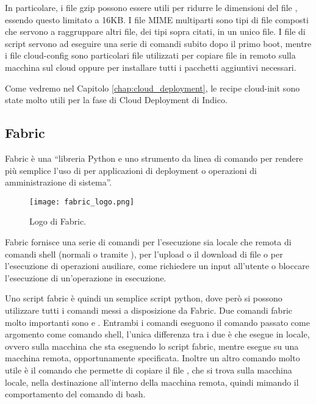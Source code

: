            In particolare, i file gzip possono essere utili per ridurre le dimensioni del file , essendo questo limitato a 16KB. I file \ac{MIME} multiparti sono tipi di file composti che servono a raggruppare altri file, dei tipi sopra citati, in un unico file. I file di script servono ad eseguire una serie di comandi subito dopo il primo boot, mentre i file cloud-config sono particolari file utilizzati per copiare file in remoto sulla macchina sul cloud oppure per installare tutti i pacchetti aggiuntivi necessari.
            
            Come vedremo nel Capitolo \ref{chap:cloud_deployment}, le recipe cloud-init sono state molto utili per la fase di Cloud Deployment di Indico.
                    
        \subsection{Fabric} \label{subsec:p;sl;fabric}
        
            Fabric è una ``libreria Python e uno strumento da linea di comando per rendere più semplice l'uso di  per applicazioni di deployment o operazioni di amministrazione di sistema''. \cite{fabric:documentation}
            
        	\begin{figure}[h!]
        		\begin{center}
        			\texttt{[image: fabric\_logo.png]}
        		\end{center}
        		\caption[Logo di Fabric]{Logo di Fabric.}
        		\label{fig:fabric_logo}
        	\end{figure}
            
            Fabric fornisce una serie di comandi per l'esecuzione sia locale che remota di comandi shell (normali o tramite ), per l'upload o il download di file o per l'esecuzione di operazioni ausiliare, come richiedere un input all'utente o bloccare l'esecuzione di un'operazione in esecuzione.
            
            Uno script fabric è quindi un semplice script python, dove però si possono utilizzare tutti i comandi messi a disposizione da Fabric. Due comandi fabric molto importanti sono  e . Entrambi i comandi eseguono il comando  passato come argomento come comando shell, l'unica differenza tra i due è che  esegue  in locale, ovvero sulla macchina che sta eseguendo lo script fabric, mentre  esegue  su una macchina remota, opportunamente specificata. Inoltre un altro comando molto utile è il comando  che permette di copiare il file , che si trova sulla macchina locale, nella destinazione  all'interno della macchina remota, quindi mimando il comportamento del comando  di bash.
            
